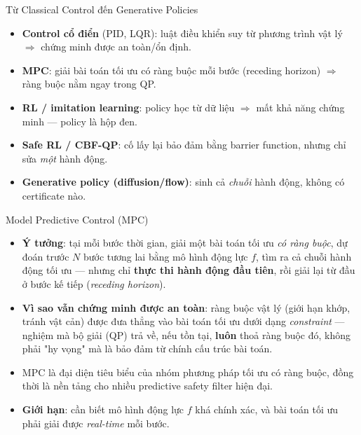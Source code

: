 \documentclass[aspectratio=169]{beamer}
\newcommand{\good}[1]{\textcolor{green!40!black}{#1}}
\newcommand{\bad}[1]{\textcolor{red!60!black}{#1}}
\begin{document}
\begin{frame}[t,shrink=8]{Từ Classical Control đến Generative Policies}
\begin{itemize}
    \item \textbf{Control cổ điển} (PID, LQR): luật điều khiển suy từ phương trình vật lý $\Rightarrow$ \good{chứng minh được} an toàn/ổn định.
    \item \textbf{MPC}: giải bài toán tối ưu có ràng buộc mỗi bước (receding horizon) $\Rightarrow$ ràng buộc nằm ngay trong QP.
    \item \textbf{RL / imitation learning}: policy học từ dữ liệu $\Rightarrow$ \bad{mất khả năng chứng minh} --- policy là hộp đen.
    \item \textbf{Safe RL / CBF-QP}: cố lấy lại bảo đảm bằng barrier function, nhưng chỉ sửa \emph{một} hành động.
    \item \textbf{Generative policy (diffusion/flow)}: sinh cả \emph{chuỗi} hành động, không có certificate nào.
\end{itemize}
\end{frame}

\begin{frame}[t,shrink=8]{Model Predictive Control (MPC)}
\begin{itemize}
    \item \textbf{Ý tưởng}: tại mỗi bước thời gian, giải một bài toán tối ưu \emph{có ràng buộc}, dự đoán trước $N$ bước tương lai bằng mô hình động lực $f$, tìm ra cả chuỗi hành động tối ưu --- nhưng chỉ \textbf{thực thi hành động đầu tiên}, rồi giải lại từ đầu ở bước kế tiếp (\emph{receding horizon}).
    \item \textbf{Vì sao vẫn chứng minh được an toàn}: ràng buộc vật lý (giới hạn khớp, tránh vật cản) được đưa thẳng vào bài toán tối ưu dưới dạng \emph{constraint} --- nghiệm mà bộ giải (QP) trả về, nếu tồn tại, \textbf{luôn} thoả ràng buộc đó, không phải "hy vọng" mà là bảo đảm từ chính cấu trúc bài toán.
    \item MPC là đại diện tiêu biểu của nhóm phương pháp tối ưu có ràng buộc, đồng thời là nền tảng cho nhiều predictive safety filter hiện đại.
    \item \textbf{Giới hạn}: cần biết mô hình động lực $f$ khá chính xác, và bài toán tối ưu phải giải được \emph{real-time} mỗi bước.
\end{itemize}
\end{frame}
\end{document}
